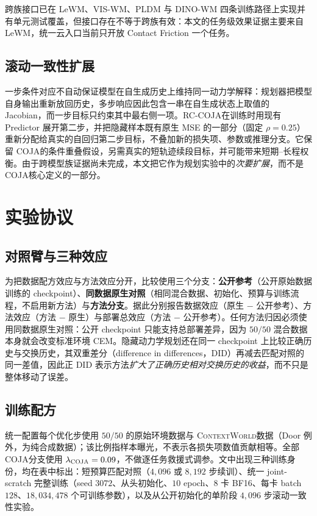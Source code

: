 \documentclass[UTF8,zihao=-4,fontset=fandol]{ctexart}
\newcommand{\method}{\textsc{COJA}}
\newcommand{\rcmethod}{\textsc{RC-COJA}}
\newcommand{\benchmark}{\textsc{ContextWorld}}
\begin{document}
跨族接口已在 LeWM、VIS-WM、PLDM 与 DINO-WM 四条训练路径上实现并有单元测试覆盖，但接口存在不等于跨族有效：本文的任务级效果证据主要来自 LeWM，统一云入口当前只开放 Contact Friction 一个任务。

\subsection{滚动一致性扩展}
\label{sec:rc}

一步条件对应不自动保证模型在自生成历史上维持同一动力学解释：规划器把模型自身输出重新放回历史，多步响应因此包含一串在自生成状态上取值的 Jacobian，而一步目标只约束其中最右侧一项。\rcmethod 在训练时用现有 Predictor 展开第二步，并把隐藏样本既有原生 MSE 的一部分（固定 $\rho=0.25$）重新分配给真实的自回归第二步目标，不叠加新的损失项、参数或推理分支。它保留 \method 的条件重叠假设，另需真实的短轨迹续段目标，并可能带来短期--长程权衡。由于跨模型族证据尚未完成，本文把它作为规划实验中的\emph{次要扩展}，而不是 \method 核心定义的一部分。

\section{实验协议}
\label{sec:protocol}

\subsection{对照臂与三种效应}

为把数据配方效应与方法效应分开，比较使用三个分支：\textbf{公开参考}（公开原始数据训练的 checkpoint）、\textbf{同数据原生对照}（相同混合数据、初始化、预算与训练流程，不启用新方法）与\textbf{方法分支}。据此分别报告数据效应（原生 $-$ 公开参考）、方法效应（方法 $-$ 原生）与部署总效应（方法 $-$ 公开参考）。任何方法归因必须使用同数据原生对照：公开 checkpoint 只能支持总部署差异，因为 $50/50$ 混合数据本身就会改变标准环境 CEM。隐藏动力学规划还在同一 checkpoint 上比较正确历史与交换历史，其双重差分（difference in differences，DID）再减去匹配对照的同一差值，因此正 DID 表示方法\emph{扩大了正确历史相对交换历史的收益}，而不只是整体移动了误差。

\subsection{训练配方}

统一配置每个优化步使用 $50/50$ 的原始环境数据与 \benchmark 数据（Door 例外，为纯合成数据）；该比例指样本曝光，不表示各损失项数值贡献相等。全部 \method 分支使用 $\lambda_{\method}=0.09$，不做逐任务救援式调参。文中出现三种训练身份，均在表中标出：短预算匹配对照（$4{,}096$ 或 $8{,}192$ 步续训）、统一 joint-scratch 完整训练（seed $3072$、从头初始化、$10$ epoch、$8$ 卡 BF16、每卡 batch $128$、$18{,}034{,}478$ 个可训练参数），以及从公开初始化的单阶段 $4{,}096$ 步滚动一致性实验。
\end{document}
